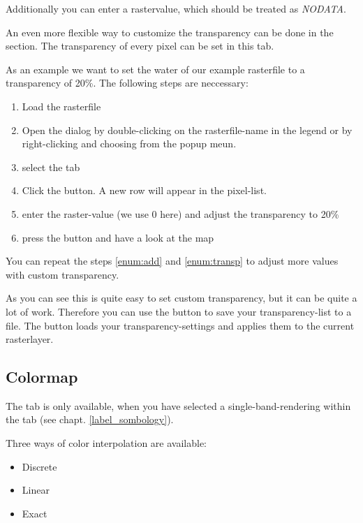 Additionally you can enter a rastervalue, which should be treated as
{\em NODATA}.

An even more flexible way to customize the transparency can be done in the
 section.
The transparency of every pixel can be set in this tab.

As an example we want to set the water of our example rasterfile
 to a transparency of 20\%. The following steps
are neccessary:
\begin{enumerate}
 \item  Load the rasterfile 
 \item Open the  dialog by double-clicking on the
 rasterfile-name in the legend or by right-clicking and choosing
  from the popup meun.
 \item select the  tab
 \item \label{enum:add} Click the 
 button. A new row will appear in the pixel-list.
 \item \label{enum:transp} enter the raster-value (we use 0 here) and adjust the
 transparency to 20\%
 \item press the  button and have a look at the map
\end{enumerate}

You can repeat the steps \ref{enum:add} and \ref{enum:transp} to adjust
more values with custom transparency.

As you can see this is quite easy to set custom transparency, but it can be
quite a lot of work. Therefore you can use the button
 to save your
transparency-list to a file. The button
 loads your
transparency-settings and applies them to the current rasterlayer.

\subsection{Colormap} \label{label_colormaptab}

The  tab is only available, when you have selected a
single-band-rendering within the tab  (see chapt. \ref{label_sombology}).

Three ways of color interpolation are available:
\begin{itemize}[label=--]
\item Discrete
\item Linear 
\item Exact
\end{itemize}

